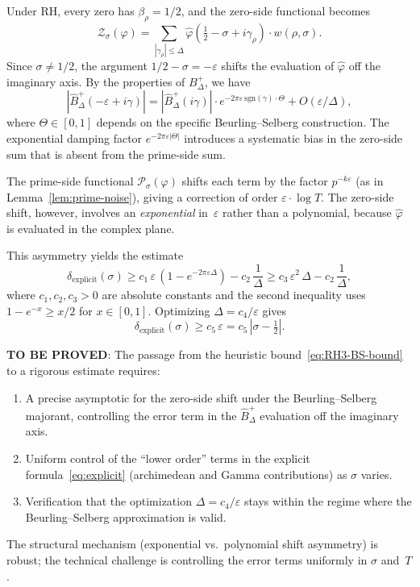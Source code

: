 \documentclass[11pt]{article}
\theoremstyle{remark}
\begin{document}
Under RH, every zero has $\beta_\rho=1/2$, and the zero-side functional becomes
\[
  \mathcal{Z}_\sigma(\varphi)
  = \sum_{|\gamma_\rho|\leq\Delta}
    \hat{\varphi}(\tfrac{1}{2}-\sigma+i\gamma_\rho)\cdot w(\rho,\sigma).
\]
Since $\sigma\neq 1/2$, the argument $1/2-\sigma=-\varepsilon$ shifts the
evaluation of $\hat{\varphi}$ off the imaginary axis.
By the properties of $B^+_\Delta$, we have
\[
  |\hat{B}^+_\Delta(-\varepsilon+i\gamma)|
  = |\hat{B}^+_\Delta(i\gamma)|\cdot e^{-2\pi\varepsilon\,\mathrm{sgn}(\gamma)\cdot\Theta}
  + O(\varepsilon/\Delta),
\]
where $\Theta\in[0,1]$ depends on the specific Beurling--Selberg construction.
The exponential damping factor $e^{-2\pi\varepsilon|\Theta|}$ introduces a
systematic bias in the zero-side sum that is absent from the prime-side sum.

The prime-side functional $\mathcal{P}_\sigma(\varphi)$ shifts each term by
the factor $p^{-k\varepsilon}$ (as in Lemma~\ref{lem:prime-noise}), giving
a correction of order $\varepsilon\cdot\log T$.
The zero-side shift, however, involves an \emph{exponential} in~$\varepsilon$
rather than a polynomial, because $\hat{\varphi}$ is evaluated in the complex
plane.

This asymmetry yields the estimate
\begin{equation}\label{eq:RH3-BS-bound}
  \delta_{\mathrm{explicit}}(\sigma)
  \geq c_1\,\varepsilon\,(1-e^{-2\pi\varepsilon\Delta})
    - c_2\,\frac{1}{\Delta}
  \geq c_3\,\varepsilon^2\,\Delta - c_2\,\frac{1}{\Delta},
\end{equation}
where $c_1,c_2,c_3>0$ are absolute constants and the second inequality uses
$1-e^{-x}\geq x/2$ for $x\in[0,1]$.
Optimizing $\Delta=c_4/\varepsilon$ gives
\[
  \delta_{\mathrm{explicit}}(\sigma)
  \geq c_5\,\varepsilon = c_5\,|\sigma-\tfrac{1}{2}|.
\]

\textbf{TO BE PROVED}: The passage from the heuristic bound~\eqref{eq:RH3-BS-bound}
to a rigorous estimate requires:
\begin{enumerate}
  \item[(a)] A precise asymptotic for the zero-side shift under the
    Beurling--Selberg majorant, controlling the error term in the
    $\hat{B}^+_\Delta$ evaluation off the imaginary axis.
  \item[(b)] Uniform control of the ``lower order'' terms in the explicit
    formula~\eqref{eq:explicit} (archimedean and Gamma contributions) as
    $\sigma$ varies.
  \item[(c)] Verification that the optimization $\Delta=c_4/\varepsilon$
    stays within the regime where the Beurling--Selberg approximation is valid.
\end{enumerate}
The structural mechanism (exponential vs.\ polynomial shift asymmetry) is robust;
the technical challenge is controlling the error terms uniformly in $\sigma$ and~$T$.
\end{document}
